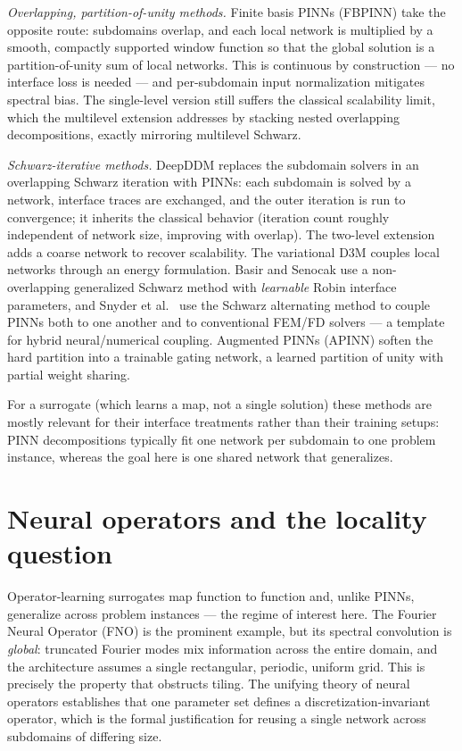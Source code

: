 \documentclass[11pt]{article}
\begin{document}
\emph{Overlapping, partition-of-unity methods.} Finite basis PINNs (FBPINN)
\cite{moseley2023fbpinn} take the opposite route: subdomains overlap, and each
local network is multiplied by a smooth, compactly supported window function so
that the global solution is a partition-of-unity sum of local networks. This is
continuous by construction --- no interface loss is needed --- and per-subdomain
input normalization mitigates spectral bias. The single-level version still
suffers the classical scalability limit, which the multilevel extension
\cite{dolean2024multilevel} addresses by stacking nested overlapping
decompositions, exactly mirroring multilevel Schwarz.

\emph{Schwarz-iterative methods.} DeepDDM \cite{li2020deepddm} replaces the
subdomain solvers in an overlapping Schwarz iteration with PINNs: each subdomain
is solved by a network, interface traces are exchanged, and the outer iteration
is run to convergence; it inherits the classical behavior (iteration count
roughly independent of network size, improving with overlap). The two-level
extension \cite{dolean2024twolevel} adds a coarse network to recover scalability.
The variational D3M \cite{li2020d3m} couples local networks through an energy
formulation. Basir and Senocak \cite{basir2023schwarz} use a non-overlapping
generalized Schwarz method with \emph{learnable} Robin interface parameters, and
Snyder et al.\ \cite{snyder2023schwarzpinn} use the Schwarz alternating method to
couple PINNs both to one another and to conventional FEM/FD solvers --- a
template for hybrid neural/numerical coupling. Augmented PINNs (APINN)
\cite{hu2023apinn} soften the hard partition into a trainable gating network, a
learned partition of unity with partial weight sharing.

For a surrogate (which learns a map, not a single solution) these methods are
mostly relevant for their interface treatments rather than their training
setups: PINN decompositions typically fit one network per subdomain to one
problem instance, whereas the goal here is one shared network that generalizes.

\section{Neural operators and the locality question}

Operator-learning surrogates map function to function and, unlike PINNs,
generalize across problem instances --- the regime of interest here. The Fourier
Neural Operator (FNO) \cite{li2021fno} is the prominent example, but its spectral
convolution is \emph{global}: truncated Fourier modes mix information across the
entire domain, and the architecture assumes a single rectangular, periodic,
uniform grid. This is precisely the property that obstructs tiling. The unifying
theory of neural operators \cite{kovachki2023neuraloperator} establishes that one
parameter set defines a discretization-invariant operator, which is the formal
justification for reusing a single network across subdomains of differing size.
\end{document}
